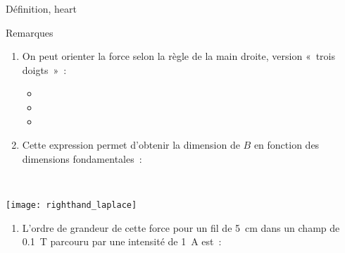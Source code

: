 \documentclass[../main/main.tex]{subfiles}
\begin{document}
\begin{tdefi}{Définition, heart}
\end{tdefi}
\begin{rexem}{Remarques}
	\begin{minipage}[t]{.68\linewidth}
		\begin{enumerate}
			\item On peut orienter la force selon la règle de la main droite, version
			      «~trois doigts~»~:
			      \begin{itemize}[label=$\diamond$, leftmargin=20pt]
				      \item {}
				      \item {}
				      \item {}
			      \end{itemize}
			\item Cette expression permet d'obtenir la dimension de $B$ en fonction des
			      dimensions fondamentales~:
		\end{enumerate}
	\end{minipage}
	\hfill
	\begin{minipage}[t]{.30\linewidth}
		~
		\vspace*{-20pt}
		\begin{center}
			\texttt{[image: righthand\_laplace]}
			\label{fig:ra_lpl}
		\end{center}
	\end{minipage}
	\begin{enumerate}[start=3]
		\item L'ordre de grandeur de cette force pour un fil de \SI{5}{cm} dans un
		      champ de \SI{0.1}{T} parcouru par une intensité de \SI{1}{A} est~:

\end{enumerate}
\end{rexem}
\end{document}

